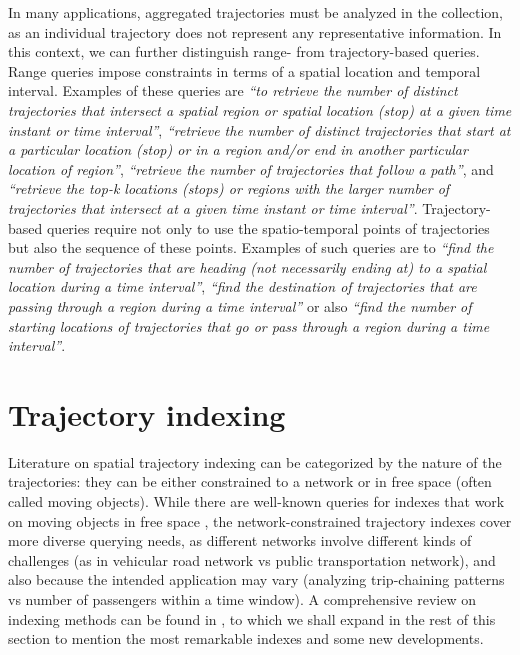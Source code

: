 \documentclass[a4paper,10pt,twoside]{book}
\begin{document}
    In many applications, aggregated trajectories must be analyzed in the collection, as an individual trajectory does not represent any representative information.
    In this context, we can  further distinguish range- from trajectory-based queries. Range queries impose constraints in terms of a spatial location  and temporal interval.  Examples of these queries are  \textit{``to retrieve the number of distinct trajectories  that intersect a spatial region or spatial location (stop) at a given time instant or time interval''}, \textit{``retrieve the number of distinct trajectories that start at a particular location (stop) or in a region and/or end in another particular location of region''}, \textit{``retrieve the number of trajectories that follow a path''}, 
     and \textit{``retrieve the  top-k locations (stops) or regions  with the larger number of  trajectories that  intersect  at a given time instant or time interval''}. Trajectory-based queries require not only to use the spatio-temporal points of trajectories  but also the sequence of these points. Examples of such queries are to \textit{``find the number of trajectories that are heading (not necessarily ending at) to a spatial location during a time interval''}, \textit{``find the destination of trajectories that are passing through a region during a time interval''} or also \textit{``find the number of starting locations of  trajectories that go or pass through a region during a time interval''}.
	
	\section{Trajectory indexing}
	\label{sec:ti}
	Literature on spatial trajectory indexing can be categorized by the nature of the trajectories: they can be either constrained to a network or in free space (often called moving objects). While there are well-known queries for indexes that work on moving objects in free space \cite{DBLP:conf/vldb/PfoserJT00}, the \mbox{network-constrained} trajectory indexes cover more diverse querying needs, as different networks involve different kinds of challenges (as in vehicular road network vs public transportation network), and also because the intended application may vary (analyzing trip-chaining patterns vs number of passengers within a time window). A comprehensive review on indexing methods can be found in \cite[Chapter 4]{DBLP:books/sp/PelekisT14}, to which we shall expand in the rest of this section to mention the most remarkable indexes and some new developments.
	
\end{document}
